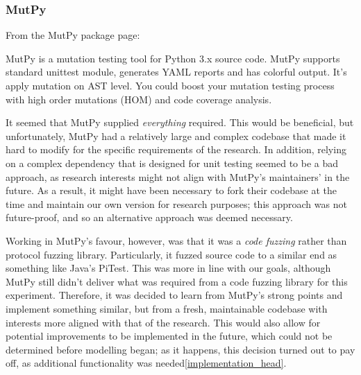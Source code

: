 \subsubsection{MutPy} %
\label{fuzzing_mutpy}
From the MutPy package page\cite{MutPy26:online}: 
\begin{displayquote}
MutPy is a mutation testing tool for Python 3.x source code. MutPy supports standard unittest module, generates YAML reports and has colorful output. It’s apply mutation on AST level. You could boost your mutation testing process with high order mutations (HOM) and code coverage analysis.
\end{displayquote}\par

It seemed that MutPy supplied \emph{everything} required. This would be beneficial, but unfortunately, MutPy had a relatively large and complex codebase\cite{khala8:online} that made it hard to modify for the specific requirements of the research. In addition, relying on a complex dependency that is designed for unit testing seemed to be a bad approach, as research interests might not align with MutPy's maintainers' in the future. As a result, it might have been necessary to fork their codebase at the time and maintain our own version for research purposes; this approach was not future-proof, and so an alternative approach was deemed necessary. \par

Working in MutPy's favour, however, was that it was a \emph{code fuzzing} rather than protocol fuzzing library. Particularly, it fuzzed source code to a similar end as something like Java's PiTest\cite{PITMu92:online}. This was more in line with our goals, although MutPy still didn't deliver what was required from a code fuzzing library for this experiment. Therefore, it was decided to learn from MutPy's strong points and implement something similar, but from a fresh, maintainable codebase with interests more aligned with that of the research. This would also allow for potential improvements to be implemented in the future, which could not be determined before modelling began; as it happens, this decision turned out to pay off, as additional functionality was needed\cref{implementation_head}. \par

